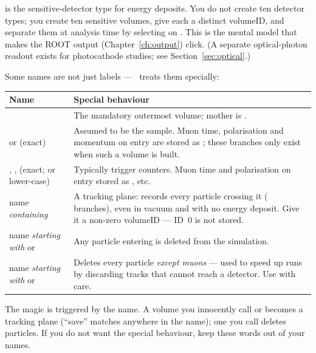 \begin{keypoint}
 is the sensitive-detector type for energy deposits. You do not create ten detector types; you create ten sensitive volumes, give each a distinct volumeID, and separate them at analysis time by selecting on . This is the mental model that makes the ROOT output (Chapter~\ref{ch:output}) click. (A separate optical-photon readout exists for photocathode studies; see Section~\ref{sec:optical}.)
\end{keypoint}

Some names are not just labels --- \musrSim\ treats them specially:

{\tablestyle
\begin{tabularx}{\textwidth}{@{}>{\raggedright\arraybackslash}p{} L@{}}
\toprule
\textbf{Name} & \textbf{Special behaviour}\\
\midrule
{} & The mandatory outermost volume; mother is .\\
 or  (exact) & Assumed to be the sample. Muon time, polarisation and momentum on entry are stored as ; these branches only exist when such a volume is built.\\
, ,  (exact; or lower-case) & Typically trigger counters. Muon time and polarisation on entry stored as , etc.\\
name \emph{containing}  & A tracking plane: records every particle crossing it ( branches), even in vacuum and with no energy deposit. Give it a non-zero volumeID --- ID~0 is not stored.\\
name \emph{starting with}  or  & Any particle entering is deleted from the simulation.\\
name \emph{starting with}  or  & Deletes every particle \emph{except muons} --- used to speed up runs by discarding tracks that cannot reach a detector. Use with care.\\
\bottomrule
\end{tabularx}}

\begin{pitfall}
The magic is triggered by the name. A volume you innocently call  or  becomes a tracking plane (``save'' matches anywhere in the name); one you call  deletes particles. If you do not want the special behaviour, keep these words out of your names.
\end{pitfall}

